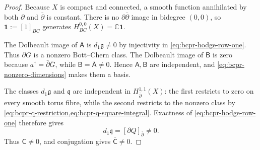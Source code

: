 \begin{proof}
Because $X$ is compact and connected, a smooth function annihilated by both
$\partial$ and $\bar\partial$ is constant.  There is no
$\partial\bar\partial$ image in bidegree $(0,0)$, so
$\mathbf1:=[1]_{BC}$ generates
$H^{0,0}_{BC}(X)=\mathbb C\mathbf1$.

The Dolbeault image of $\mathsf A$ is
$d_1\mathfrak g\neq0$ by injectivity in
\cref{eq:bcpr-hodge-row-one}.  Thus $\partial G$ is a nonzero
Bott--Chern class.  The Dolbeault image of $\mathsf B$ is zero because
$a^\dagger=\bar\partial\bar G$, while
$\mathsf B=\overline{\mathsf A}\neq0$.  Hence
$\mathsf A,\mathsf B$ are independent, and
\cref{eq:bcpr-nonzero-dimensions} makes them a basis.

The classes $d_1\mathfrak g$ and $\mathfrak q$ are independent in
$H^{1,1}_{\bar\partial}(X)$: the first restricts to zero on every smooth
torus fibre, while the second restricts to the nonzero class
by \cref{eq:bcpr-q-restriction,eq:bcpr-q-square-integral}.  Exactness of
\cref{eq:bcpr-hodge-row-one} therefore gives
\begin{equation}
 d_1\mathfrak q=[\partial Q]_{\bar\partial}\neq0.
\label{eq:bcpr-c-nonzero}
\end{equation}
Thus $\mathsf C\neq0$, and conjugation gives
$\overline{\mathsf C}\neq0$.


\end{proof}
